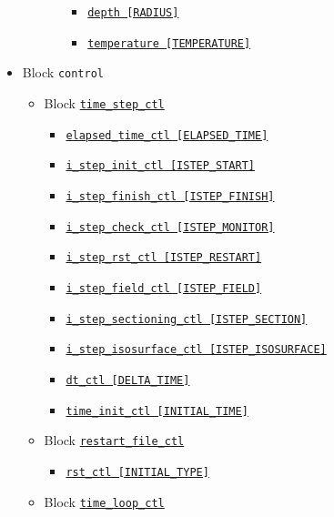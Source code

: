 \begin{itemize}
\begin{itemize}
\begin{itemize}
\begin{itemize}
			\item \hyperref[href_t:depth]      {\tt depth        [RADIUS]}
			\item \hyperref[href_t:temperature]{\tt temperature  [TEMPERATURE]}
			\end{itemize}
		\end{itemize}
	\end{itemize}
%
\item Block \verb|control|
	\begin{itemize}
	\item Block \hyperref[href_t:time_step_ctl]{\tt time\_step\_ctl}
		\begin{itemize} \label{href_i:time_step_ctl}
		\item \hyperref[href_t:elapsed_time_ctl]
			{\tt elapsed\_time\_ctl        [ELAPSED\_TIME]}
		\item \hyperref[href_t:i_step_init_ctl]
			{\tt i\_step\_init\_ctl        [ISTEP\_START]}
		\item \hyperref[href_t:i_step_finish_ctl]
			{\tt i\_step\_finish\_ctl      [ISTEP\_FINISH]}
		\item \hyperref[href_t:i_step_check_ctl]
			{\tt i\_step\_check\_ctl       [ISTEP\_MONITOR]}
		\item \hyperref[href_t:i_step_rst_ctl]
			{\tt i\_step\_rst\_ctl         [ISTEP\_RESTART]}
		\item \hyperref[href_t:i_step_field_ctl]
			{\tt i\_step\_field\_ctl       [ISTEP\_FIELD]}
		\item \hyperref[href_t:i_step_sectioning_ctl]
			{\tt i\_step\_sectioning\_ctl  [ISTEP\_SECTION]}
		\item \hyperref[href_t:i_step_isosurface_ctl]
			{\tt i\_step\_isosurface\_ctl  [ISTEP\_ISOSURFACE]}
		\item \hyperref[href_t:dt_ctl]
			{\tt dt\_ctl                   [DELTA\_TIME]}
		\item \hyperref[href_t:time_init_ctl]
			{\tt time\_init\_ctl           [INITIAL\_TIME]}
		\end{itemize}
%
	\item Block \hyperref[href_t:restart_file_ctl]{\tt restart\_file\_ctl}
		\begin{itemize} \label{href_i:restart_file_ctl}
		\item \hyperref[href_t:rst_ctl]{\tt rst\_ctl      [INITIAL\_TYPE]}
		\end{itemize}
%
	\item Block \verb||
    		\hyperref[href_t:time_loop_ctl]{\tt time\_loop\_ctl}
		\begin{itemize} \label{href_i:time_loop_ctl}

\end{itemize}
\end{itemize}
\end{itemize}
